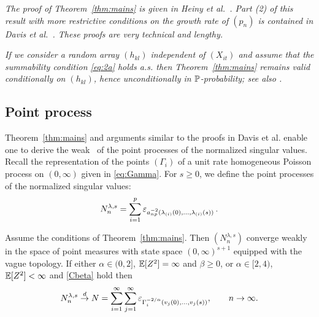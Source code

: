 \begin{remark}\em
The proof of Theorem~\ref{thm:mains} is given in Heiny et al.~\cite{heiny:mikosch:2016:noniid}. Part (2) of this  result
with more restrictive conditions on the growth rate of $(p_n)$ is contained in Davis et al.~\cite{davis:mikosch:pfaffel:2015}.
These proofs are very technical and lengthy.
\end{remark}
\begin{remark}\em
If we consider a random array $(h_{kl})$ independent of  $(X_{it})$ and
assume that the summability
condition \eqref{eq:2a} holds a.s.
then Theorem~\ref{thm:mains} remains valid conditionally on
$(h_{kl})$, hence  unconditionally in $\P$-probability; see also \cite{davis:mikosch:pfaffel:2015}.\end{remark}
\subsection{Point process \con }
Theorem~\ref{thm:mains}  and arguments similar to the proofs in Davis et al. \cite{davis:mikosch:pfaffel:2015}
enable one to derive the weak \con\ of
the point processes of the normalized singular values. Recall
the representation of the points $(\Gamma_i)$ of a unit rate homogeneous Poisson process on $(0,\infty)$
given in \eqref{eq:Gamma}. For $s\ge 0$, we define the point processes of the normalized singular values:
\begin{equation}\label{eq:ppdef}
N_n^{\lambda,s}=\sum_{i=1}^p \vep_{a_{np}^{-2}(\lambda_{(i)}(0),\ldots,\lambda_{(i)}(s))} \,.
\end{equation}

\begin{theorem}\label{cor:1}
Assume the conditions of Theorem~\ref{thm:mains}.
Then $(N_n^{\lambda,s})$ converge weakly in the space of point measures
with state space $(0,\infty)^{s+1}$ equipped with the vague topology.
If either $\alpha \in (0,2]$, $\E[Z^2]=\infty$ and $\beta \ge 0$,
or $\alpha \in [2,4)$, $\E[Z^2]<\infty$ and \ref{Cbeta} hold then
\begin{equation}\label{eq:Davispp}
N_n^{\lambda,s} \cid N= \sum_{i=1}^\infty
\sum_{j=1}^{\infty} \vep_{\Gamma_i^{-2/\alpha} (v_j(0),\ldots,v_j(s))}, \qquad \nto.
\end{equation}
\end{theorem}

